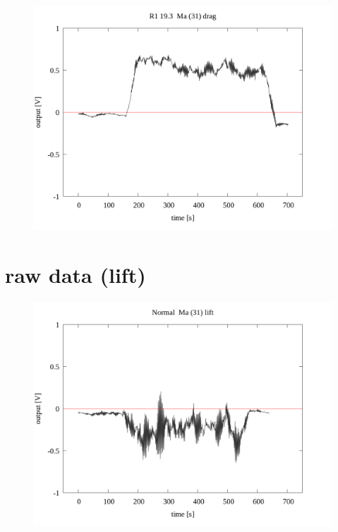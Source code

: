 \documentclass[a4paper]{jsarticle}
\begin{document}
\begin{figure}[htbp]
    \footnotesize
    \begin{center}
        \includegraphics[width=140mm]{../../../33_result/210806/moving_average/31/drag/R1_19.3_ma(31)_drag.png}
    \end{center}
\end{figure}

\section{raw data (lift)}

\begin{figure}[htbp]
    \footnotesize
    \begin{center}
        \includegraphics[width=140mm]{../../../33_result/210806/moving_average/31/lift/Normal_ma(31)_lift.png}
    \end{center}
\end{figure}
\end{document}
